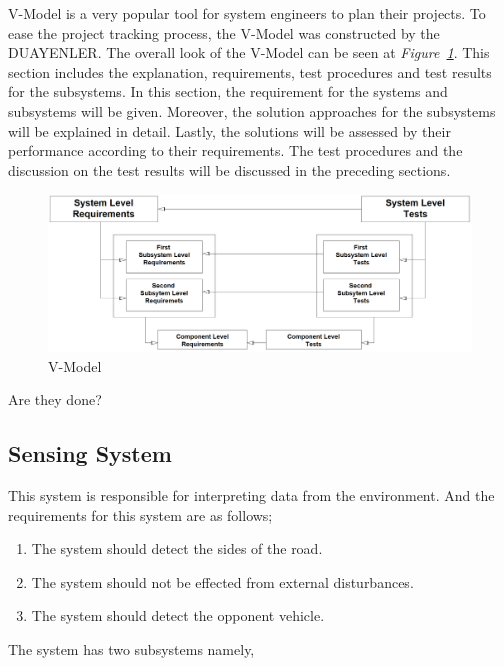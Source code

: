 \documentclass[a4paper,12pt]{article}
\begin{document}
	
	
	
	V-Model is a very popular tool for system engineers to plan their projects. To ease the project tracking process, the V-Model was constructed by the DUAYENLER. The overall look of the V-Model can be seen at \textit{Figure~\ref{fig:vmodel}}. This section includes the explanation, requirements, test procedures and test results for the subsystems. In this section, the requirement for the systems and subsystems will be given. Moreover, the solution approaches for the subsystems will be explained in detail. Lastly, the solutions will be assessed by their performance according to their requirements. The test procedures and the discussion on the test results will be discussed in the preceding sections.
	
	\begin{figure}[h]
		\includegraphics[width=\textwidth,center]{images/vModels/vmodel}
		\caption{V-Model}\label{fig:vmodel}
	\end{figure}
			

Are they done?
		
		
				
		
		\subsection{Sensing System}
	
				This system is responsible for interpreting data from the environment. And the requirements for this system are as follows;
			\begin{enumerate}
		\item The system should detect the sides of the road.
		\item The system should not be effected from external disturbances.
		\item The system should detect the opponent vehicle.
				\end{enumerate}	
				The system has two subsystems namely, 
				
\end{document}
